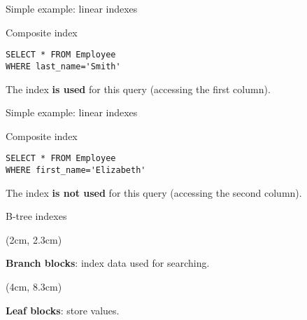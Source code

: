 \documentclass[xcolor=table]{beamer}
\begin{document}
\begin{frame}[fragile]{Simple example: linear indexes}
  \begin{block}{Composite index}
\begin{verbatim}
SELECT * FROM Employee 
WHERE last_name='Smith' 
\end{verbatim}
The index {\bf is used} for this query (accessing the first column).
  \end{block}
    \begin{center}
    \end{center}
  \end{frame}

\begin{frame}[fragile]{Simple example: linear indexes}
  \begin{block}{Composite index}
\begin{verbatim}
SELECT * FROM Employee 
WHERE first_name='Elizabeth' 
\end{verbatim}
The index {\bf is not used} for this query (accessing the second column).
  \end{block}
    \begin{center}
    \end{center}
  \end{frame}



\begin{frame}{B-tree indexes}
  \begin{center}
  \end{center}
  \href{https://docs.oracle.com/cd/E11882_01/server.112/e40540/indexiot.htm}{}

  \begin{textblock*}{5cm}(2cm, 2.3cm)
    \begin{tcolorbox}
      \footnotesize
      {\bf Branch blocks}: index data used for searching.
    \end{tcolorbox}
  \end{textblock*}

  \begin{textblock*}{5cm}(4cm, 8.3cm)
    \begin{tcolorbox}
      \footnotesize
      {\bf Leaf blocks}: store values.
    \end{tcolorbox}
  \end{textblock*}

\end{frame}
\end{document}
